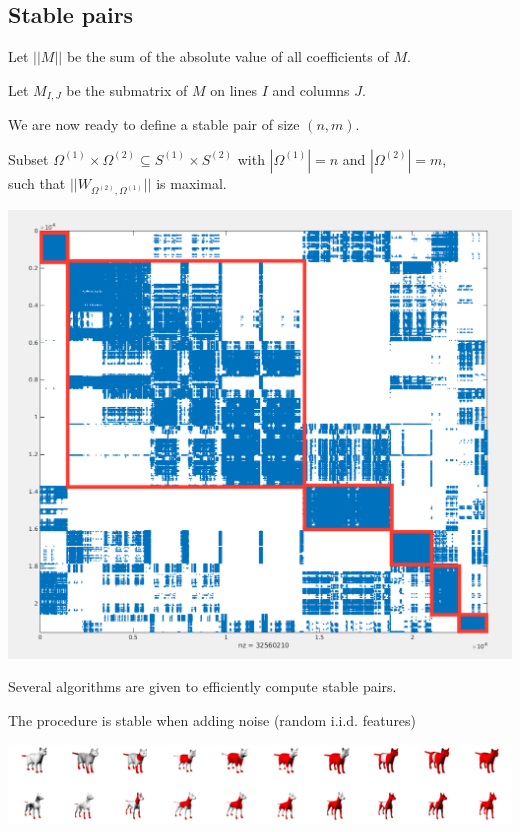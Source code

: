 \documentclass{beamer}
\begin{document}
\subsection{Stable pairs}

\begin{frame}
  Let $||M||$ be the sum of the absolute value of all coefficients of $M$.
  \par\bigskip
  Let $M_{I,J}$ be the submatrix of $M$ on lines $I$ and columns $J$.
  \par\bigskip
  We are now ready to define a stable pair of size $(n,m)$.
  \par\bigskip
  Subset $\Omega^{(1)} \times \Omega^{(2)} \subseteq S^{(1)} \times S^{(2)}$ with $|\Omega^{(1)}| = n$ and $|\Omega^{(2)}| = m$,
  \\\quad such that $||W_{\Omega^{(2)}, \Omega^{(1)}}||$ is maximal.
\end{frame}

\begin{frame}
  \centering
  \includegraphics[width=.8\textwidth]{article/matrix.png}
\end{frame}

\begin{frame}
  Several algorithms are given to efficiently compute stable pairs.
  \par\bigskip
  The procedure is stable when adding noise (random i.i.d. features)
  \par\bigskip
  \includegraphics[width=\textwidth]{article/result.png}
  
\end{frame}
\end{document}
